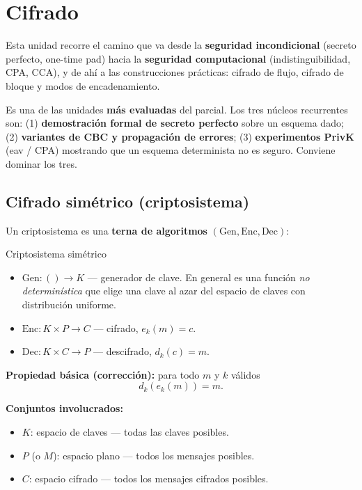 \documentclass[../main.tex]{subfiles}
\begin{document}
\section{Cifrado}

Esta unidad recorre el camino que va desde la \textbf{seguridad incondicional}
(secreto perfecto, one-time pad) hacia la \textbf{seguridad computacional}
(indistinguibilidad, CPA, CCA), y de ahí a las construcciones prácticas:
cifrado de flujo, cifrado de bloque y modos de encadenamiento.

\begin{examen}
Es una de las unidades \textbf{más evaluadas} del parcial. Los tres núcleos
recurrentes son: (1) \textbf{demostración formal de secreto perfecto} sobre un
esquema dado; (2) \textbf{variantes de CBC y propagación de errores}; (3)
\textbf{experimentos PrivK} (eav / CPA) mostrando que un esquema determinista
no es seguro. Conviene dominar los tres.
\end{examen}

\subsection{Cifrado simétrico (criptosistema)}

Un criptosistema es una \textbf{terna de algoritmos} $(\text{Gen}, \text{Enc}, \text{Dec})$:

\begin{definicion}{Criptosistema simétrico}
\begin{itemize}[nosep]
  \item $\text{Gen}: () \to K$ \quad — generador de clave. En general es una
        función \emph{no determinística} que elige una clave al azar del
        espacio de claves con distribución uniforme.
  \item $\text{Enc}: K \times P \to C$ \quad — cifrado, $e_k(m)=c$.
  \item $\text{Dec}: K \times C \to P$ \quad — descifrado, $d_k(c)=m$.
\end{itemize}
\textbf{Propiedad básica (corrección):} para todo $m$ y $k$ válidos
$$d_k(e_k(m)) = m.$$
\end{definicion}

\textbf{Conjuntos involucrados:}
\begin{itemize}[nosep]
  \item $K$: espacio de claves — todas las claves posibles.
  \item $P$ (o $M$): espacio plano — todos los mensajes posibles.
  \item $C$: espacio cifrado — todos los mensajes cifrados posibles.
\end{itemize}
\end{document}
